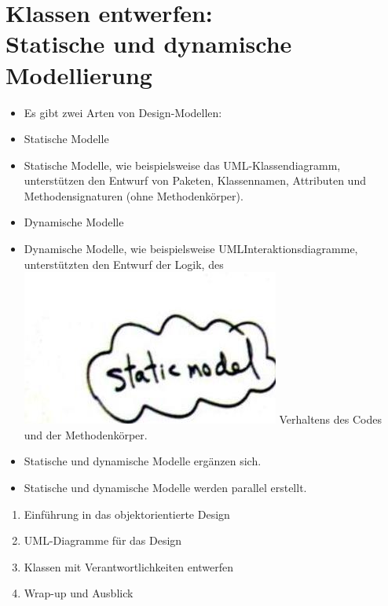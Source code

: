 \documentclass[10pt]{article}
\begin{document}
\section*{Klassen entwerfen: \\
 Statische und dynamische Modellierung}
\begin{itemize}
  \item Es gibt zwei Arten von Design-Modellen:
  \item Statische Modelle
  \item Statische Modelle, wie beispielsweise das UML-Klassendiagramm, unterstützen den Entwurf von Paketen, Klassennamen, Attributen und Methodensignaturen (ohne Methodenkörper).
  \item Dynamische Modelle
  \item Dynamische Modelle, wie beispielsweise UMLInteraktionsdiagramme, unterstützten den Entwurf der Logik, des\\
\includegraphics[max width=\textwidth]{2025_01_02_787afb9584031d2940deg-09} Verhaltens des Codes und der Methodenkörper.
  \item Statische und dynamische Modelle ergänzen sich.
  \item Statische und dynamische Modelle werden parallel erstellt.
\end{itemize}

\begin{enumerate}
  \item Einführung in das objektorientierte Design
  \item UML-Diagramme für das Design
  \item Klassen mit Verantwortlichkeiten entwerfen
  \item Wrap-up und Ausblick
\end{enumerate}
\end{document}
